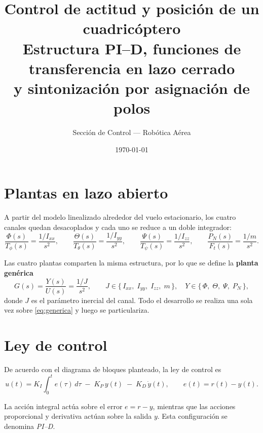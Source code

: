 \documentclass[11pt,a4paper]{article}
\title{\textbf{Control de actitud y posición de un cuadricóptero}\\[2mm]
\large Estructura PI--D, funciones de transferencia en lazo cerrado\\
y sintonización por asignación de polos}
\author{Sección de Control --- Robótica Aérea}
\date{\today}
\begin{document}
\maketitle

\section{Plantas en lazo abierto}

A partir del modelo linealizado alrededor del vuelo estacionario, los cuatro
canales quedan desacoplados y cada uno se reduce a un doble integrador:
\begin{equation}
\frac{\Phi(s)}{T_\phi(s)}=\frac{1/I_{xx}}{s^{2}},\qquad
\frac{\Theta(s)}{T_\theta(s)}=\frac{1/I_{yy}}{s^{2}},\qquad
\frac{\Psi(s)}{T_\psi(s)}=\frac{1/I_{zz}}{s^{2}},\qquad
\frac{P_N(s)}{F_t(s)}=\frac{1/m}{s^{2}} .
\label{eq:plantas}
\end{equation}

Las cuatro plantas comparten la misma estructura, por lo que se define la
\textbf{planta genérica}
\begin{equation}
G(s)=\frac{Y(s)}{U(s)}=\frac{1/J}{s^{2}},
\qquad
J \in \{\,I_{xx},\;I_{yy},\;I_{zz},\;m\,\},\quad
Y \in \{\,\Phi,\;\Theta,\;\Psi,\;P_N\,\},
\label{eq:generica}
\end{equation}
donde $J$ es el parámetro inercial del canal. Todo el desarrollo se realiza una
sola vez sobre \eqref{eq:generica} y luego se particulariza.

\section{Ley de control}

De acuerdo con el diagrama de bloques planteado, la ley de control es
\begin{equation}
u(t) = K_I \int_{0}^{t} e(\tau)\,d\tau \;-\; K_P\, y(t) \;-\; K_D\, \dot y(t),
\qquad e(t)=r(t)-y(t).
\label{eq:leycontrol}
\end{equation}

La acción integral actúa sobre el error $e=r-y$, mientras que las acciones
proporcional y derivativa actúan sobre la salida $y$. Esta configuración se
denomina \emph{PI--D}.
\end{document}
